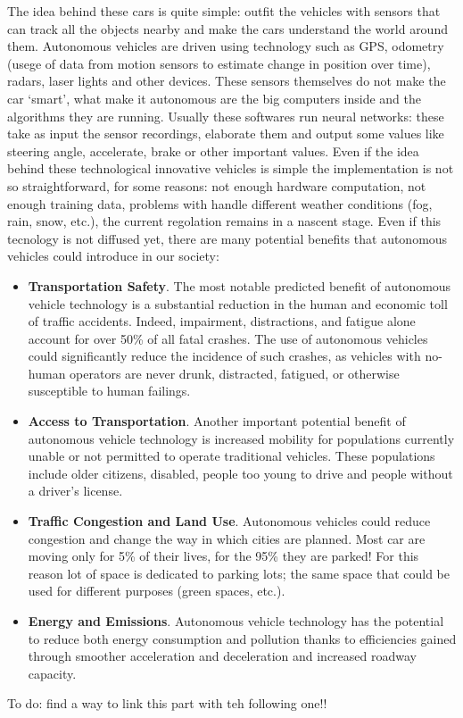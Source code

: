 \documentclass[14pt]{extarticle}
\def\ss{\vspace{25pt}}
\def\pp{\vspace{10pt}\newline}
\def\ppn{\vspace{10pt}}
\begin{document}
\begin{flushleft}
\ppn
The idea behind these cars is quite simple: outfit the vehicles with sensors that can track all the objects nearby and make the cars understand the world around them. Autonomous vehicles are driven using technology such as GPS, odometry (usege of data from motion sensors to estimate change in position over time), radars, laser lights and other devices\cite{AVlevels2}. These sensors themselves do not make the car ‘smart’, what make it autonomous are the big computers inside and the algorithms they are running. Usually these softwares run neural networks: these take as input the sensor recordings, elaborate them and output some values like steering angle, accelerate, brake or other important values. Even if the idea behind these technological innovative vehicles is simple the implementation is not so straightforward, for some reasons: not enough hardware computation, not enough training data, problems with handle different weather conditions (fog, rain, snow, etc.),  the current regolation remains in a nascent stage.
 \pp
Even if this tecnology is not diffused yet, there are many potential benefits that autonomous vehicles could introduce in our society:
 \begin{itemize}
 \item \textbf{Transportation Safety}. The most notable predicted benefit of autonomous vehicle technology is a substantial reduction in the human and economic toll of traffic accidents. Indeed, impairment, distractions, and fatigue alone account for over 50\% of all fatal crashes. The use of autonomous vehicles could significantly reduce the incidence of such crashes, as vehicles with no-human operators are never drunk, distracted, fatigued, or otherwise susceptible to human failings.
\item \textbf{Access to Transportation}. Another important potential benefit of autonomous vehicle technology is increased mobility for populations currently unable or not permitted to operate traditional vehicles. These populations include older
citizens, disabled, people too young to drive and people without a driver’s 
license.
\item \textbf{Traffic Congestion and Land Use}. Autonomous vehicles could reduce congestion and change the way in which cities are planned. Most car are moving only for 5\% of their lives, for the 95\% they are parked\cite{AVparking}! For this reason lot of space is dedicated to parking lots; the same space that could be used for different purposes (green spaces, etc.).
\item \textbf{Energy and Emissions}. Autonomous vehicle technology has the potential to reduce both energy consumption and pollution thanks to efficiencies gained through smoother acceleration and deceleration and  increased  roadway capacity.\cite{AVbenefit}
 \end{itemize}
 
 To do: find a way to link this part with teh following one!!

	\ss
\end{flushleft}
\end{document}
